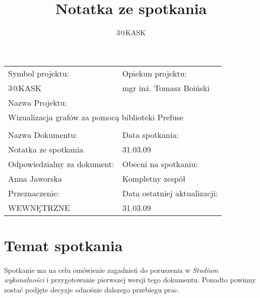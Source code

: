 \documentclass[a4paper,10pt]{article}
\title{Notatka ze spotkania}
\author{3@KASK}
\begin{document}



\maketitle


\begin{center}
\begin{tabular}{|p{7cm}|p{7cm}|}
\hline
Symbol projektu: & Opiekun projektu:   \tabularnewline 
3@KASK & mgr inż. Tomasz Boiński    \tabularnewline \hline
\multicolumn{2}{|l|}{Nazwa Projektu: } \tabularnewline
\multicolumn{2}{|l|}{Wizualizacja grafów za pomocą biblioteki Prefuse } \tabularnewline 
\hline
\multicolumn{2}{l}{ } \tabularnewline %
\hline 
Nazwa Dokumentu: & Data spotkania:   \tabularnewline 
Notatka ze spotkania & 31.03.09 \tabularnewline \hline
Odpowiedzialny za dokument: & Obecni na spotkaniu:   \tabularnewline 
Anna Jaworska & Kompletny zespół \tabularnewline \hline
Przeznaczenie: & Data ostatniej aktualizacji:   \tabularnewline 
WEWNĘTRZNE & 31.03.09 \tabularnewline \hline
\end{tabular}
\end{center}


\section{Temat spotkania}
\paragraph{}Spotkanie ma na celu omówienie zagadnień do poruszenia w \textit{Studium wykonalności} i przygotowanie pierwszej wersji tego dokumentu. Ponadto powinny zostać podjęte decyzje odnośnie dalszego przebiegu prac. 
\end{document}
